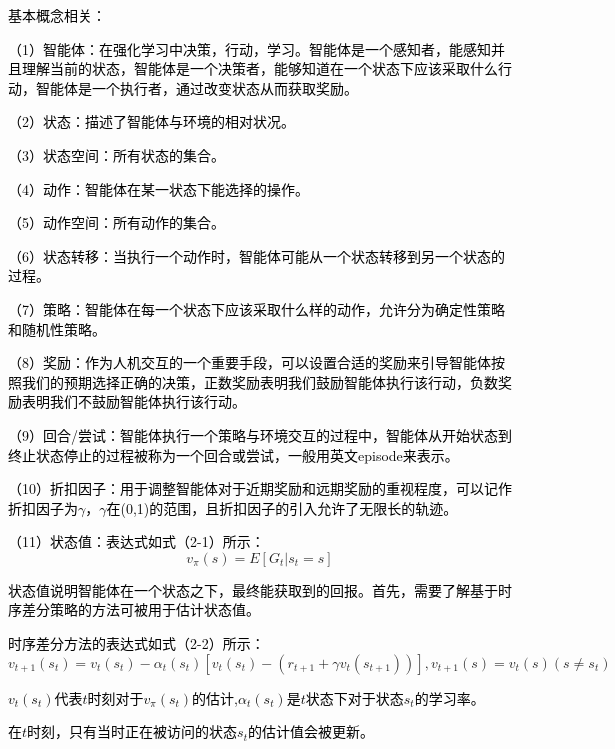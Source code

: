 \textcolor{black}{基本概念相关：}

\textcolor{black}{（1）智能体：在强化学习中决策，行动，学习。智能体是一个感知者，能感知并且理解当前的状态，智能体是一个决策者，能够知道在一个状态下应该采取什么行动，智能体是一个执行者，通过改变状态从而获取奖励。}

\textcolor{black}{（2）状态：描述了智能体与环境的相对状况。}

\textcolor{black}{（3）状态空间：所有状态的集合。}

\textcolor{black}{（4）动作：智能体在某一状态下能选择的操作。}

\textcolor{black}{（5）动作空间：所有动作的集合。}

\textcolor{black}{（6）状态转移：当执行一个动作时，智能体可能从一个状态转移到另一个状态的过程。}

\textcolor{black}{（7）策略：智能体在每一个状态下应该采取什么样的动作，允许分为确定性策略和随机性策略。}

\textcolor{black}{（8）奖励：作为人机交互的一个重要手段，可以设置合适的奖励来引导智能体按照我们的预期选择正确的决策，正数奖励表明我们鼓励智能体执行该行动，负数奖励表明我们不鼓励智能体执行该行动。}

\textcolor{black}{（9）回合/尝试：智能体执行一个策略与环境交互的过程中，智能体从开始状态到终止状态停止的过程被称为一个回合或尝试，一般用英文episode来表示。}

\textcolor{black}{（10）折扣因子：用于调整智能体对于近期奖励和远期奖励的重视程度，可以记作折扣因子为$\gamma$，$\gamma$在(0,1)的范围，且折扣因子的引入允许了无限长的轨迹。}

\textcolor{black}{（11）状态值：表达式如式（2-1）所示：}
\begin{equation}
v_{\pi}(s)=E[G_{t}|s_{t}=s]
\end{equation}

\textcolor{black}{状态值说明智能体在一个状态之下，最终能获取到的回报。首先，需要了解基于时序差分策略的方法可被用于估计状态值。}

\textcolor{black}{时序差分方法的表达式如式（2-2）所示：}
\begin{equation}
v_{t+1}(s_{t})  =v_{t}(s_{t})-\alpha_{t}(s_{t})[v_{t}(s_{t})-(r_{t+1}+\gamma v_{t}(s_{t+1}))],
v_{t+1}(s)=v_{t}(s)(s\neq s_{t})
\end{equation}

\textcolor{black}{$v_{t}(s_{t})$代表$t$时刻对于$v_{\pi}(s_{t})$的估计,${\alpha_{t}(s_{t})}$是$t$状态下对于状态$s_{t}$的学习率。}

\textcolor{black}{在$t$时刻，只有当时正在被访问的状态$s_{t}$的估计值会被更新。}

